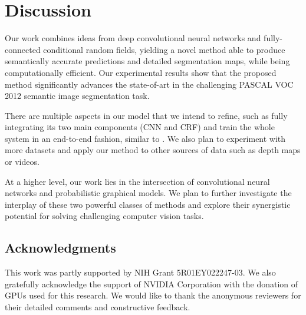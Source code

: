 \section{Discussion}
\label{sec:discussion}

Our work combines ideas from deep convolutional neural networks and
fully-connected conditional random fields, yielding a novel method able to
produce semantically accurate predictions and detailed segmentation maps,
while being computationally efficient. Our experimental results show that the
proposed method significantly advances the state-of-art in the challenging
PASCAL VOC 2012 semantic image segmentation task.

There are multiple aspects in our model that we intend to refine, such as
fully integrating its two main components (CNN and CRF) and train the whole
system in an end-to-end fashion, similar to \citet{Koltun13, chen2014learning}.
We also plan to experiment with more datasets and apply our method to other 
sources of data such as depth maps or videos.

At a higher level, our work lies in the intersection of convolutional neural
networks and probabilistic graphical models. We plan to further investigate
the interplay of these two powerful classes of methods and explore their
synergistic potential for solving challenging computer vision tasks.

\subsection*{Acknowledgments} 

This work was partly supported by NIH Grant 5R01EY022247-03. We also
gratefully acknowledge the support of NVIDIA Corporation with the
donation of GPUs used for this research. We would like to thank the
anonymous reviewers for their detailed comments and constructive
feedback.
